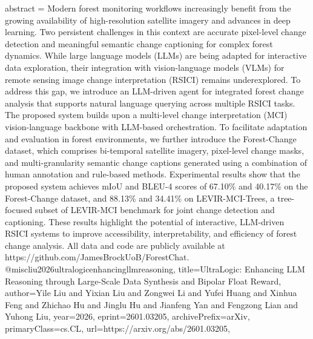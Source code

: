 {      abstract = {Modern forest monitoring workflows increasingly benefit from the growing availability of high-resolution satellite imagery and advances in deep learning. Two persistent challenges in this context are accurate pixel-level change detection and meaningful semantic change captioning for complex forest dynamics. While large language models (LLMs) are being adapted for interactive data exploration, their integration with vision-language models (VLMs) for remote sensing image change interpretation (RSICI) remains underexplored. To address this gap, we introduce an LLM-driven agent for integrated forest change analysis that supports natural language querying across multiple RSICI tasks. The proposed system builds upon a multi-level change interpretation (MCI) vision-language backbone with LLM-based orchestration. To facilitate adaptation and evaluation in forest environments, we further introduce the Forest-Change dataset, which comprises bi-temporal satellite imagery, pixel-level change masks, and multi-granularity semantic change captions generated using a combination of human annotation and rule-based methods. Experimental results show that the proposed system achieves mIoU and BLEU-4 scores of 67.10\% and 40.17\% on the Forest-Change dataset, and 88.13\% and 34.41\% on LEVIR-MCI-Trees, a tree-focused subset of LEVIR-MCI benchmark for joint change detection and captioning. These results highlight the potential of interactive, LLM-driven RSICI systems to improve accessibility, interpretability, and efficiency of forest change analysis. All data and code are publicly available at https://github.com/JamesBrockUoB/ForestChat.}
}@misc{liu2026ultralogicenhancingllmreasoning,
      title={UltraLogic: Enhancing LLM Reasoning through Large-Scale Data Synthesis and Bipolar Float Reward}, 
      author={Yile Liu and Yixian Liu and Zongwei Li and Yufei Huang and Xinhua Feng and Zhichao Hu and Jinglu Hu and Jianfeng Yan and Fengzong Lian and Yuhong Liu},
      year={2026},
      eprint={2601.03205},
      archivePrefix={arXiv},
      primaryClass={cs.CL},
      url={https://arxiv.org/abs/2601.03205},
}
